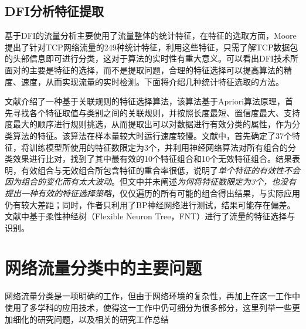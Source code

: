 \documentclass[a4papper]{article}
\begin{document}
\subsection{DFI分析特征提取}
\par\setlength{\parindent}{2em} %
基于DFI的流量分析主要使用了流量整体的统计特征，在特征的选取方面，Moore提出了针对TCP网络流量的249种统计特征，利用这些特征，只需了解TCP数据包的头部信息即可进行分类\cite{moore2013discriminators}，这对于算法的实时性有重大意义。可以看出DFI技术所面对的主要是特征的选择，而不是提取问题，合理的特征选择可以提高算法的精度、速度，从而实现流量的实时检测。下面将介绍几种统计特征选取的方法。
\par\setlength{\parindent}{2em} %
文献\cite{武建华2009基于关联规则的特征选择算法}介绍了一种基于关联规则的特征选择算法，该算法基于Apriori算法原理，首先寻找各个特征取值与类别之间的关联规则，并按照长度最短、置信度最大、支持度最大的顺序进行规则挑选，从而提取出可以对数据进行有效分类的属性，作为分类算法的特征。该算法在样本量较大时运行速度较慢。文献\cite{牟澄2014互联网流量特征智能提取关键技术研究}中，首先确定了37个特征，将训练模型所使用的特征数限定为3个，并利用神经网络算法对所有组合的分类效果进行比对，找到了其中最有效的10个特征组合和10个无效特征组合。结果表明，有效组合与无效组合所包含特征的重合率很低，说明了\emph{单个特征的有效性不会因为组合的变化而有太大波动}。但文中并未阐述\emph{为何将特征数限定为3个，也没有提出一种有效的特征选择策略}，仅仅遍历的所有可能的组合得出结果，与实际应用仍有较大差距；同时，作者只利用了BP神经网络进行测试，结果可能存在偏差。文献\cite{彭立志2015基于机器学习的流量识别关键技术研究}中基于柔性神经树（Flexible Neuron Tree，FNT）进行了流量的特征选择与识别。
\section{网络流量分类中的主要问题}
\par\setlength{\parindent}{2em} %
网络流量分类是一项明确的工作，但由于网络环境的复杂性，再加上在这一工作中使用了多学科的应用技术，使得这一工作中仍可细分为很多部分，这里列举一些更加细化的研究问题，以及相关的研究工作总结
\end{document}
